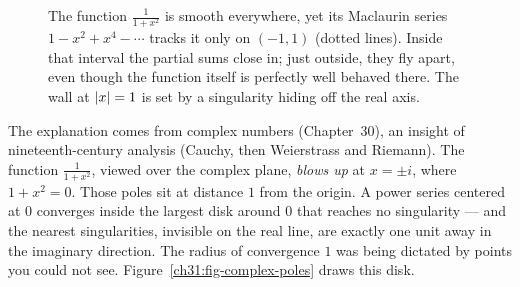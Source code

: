 \begin{figure}[H]
\centering
{}
\caption{The function $\frac{1}{1+x^2}$ is smooth everywhere, yet its Maclaurin series
$1-x^2+x^4-\cdots$ tracks it only on $(-1,1)$ (dotted lines). Inside that interval the
partial sums close in; just outside, they fly apart, even though the function itself is
perfectly well behaved there. The wall at $\lvert x\rvert=1$ is set by a singularity hiding off
the real axis.}
\label{ch31:fig-geometric}
\end{figure}

\begin{intuitionbox}
The explanation comes from complex numbers (Chapter~30), an insight of
nineteenth-century analysis (Cauchy, then Weierstrass and Riemann). The function $\frac{1}{1+x^2}$, viewed over the complex
plane, \emph{blows up} at $x = \pm i$, where $1 + x^2 = 0$. Those poles sit at
distance $1$ from the origin. A power series centered at $0$ converges inside the
largest disk around $0$ that reaches no singularity --- and the nearest singularities,
invisible on the real line, are exactly one unit away in the imaginary direction. The
radius of convergence $1$ was being dictated by points you could not see.
Figure~\ref{ch31:fig-complex-poles} draws this disk.
\end{intuitionbox}

